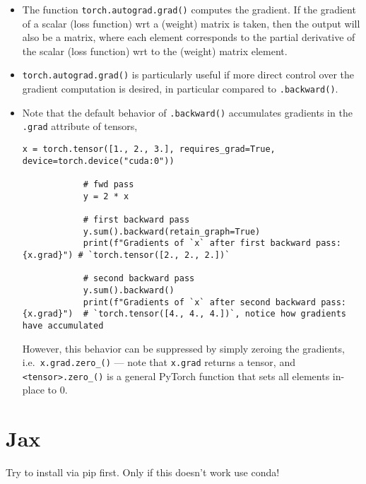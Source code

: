 \documentclass[12pt, a4paper]{scrbook}
\numberwithin{equation}{section}
\theoremstyle{definition}
\theoremstyle{definition}
\begin{document}
	\begin{itemize}
		\item The function \texttt{torch.autograd.grad()} computes the gradient. If the gradient of a scalar (loss function) wrt a (weight) matrix is taken, then the output will also be a matrix, where each element corresponds to the partial derivative of the scalar (loss function) wrt to the (weight) matrix element.
		
		\item \texttt{torch.autograd.grad()} is particularly useful if more direct control over the gradient computation is desired, in particular compared to \texttt{.backward()}.
		
		\item Note that the default behavior of \texttt{.backward()} accumulates gradients in the \texttt{.grad} attribute of tensors,
		
		\begin{lstlisting}[style=mystylepython, label=alg:torch_backward, xleftmargin=\parindent]
			x = torch.tensor([1., 2., 3.], requires_grad=True, device=torch.device("cuda:0"))
			
			# fwd pass
			y = 2 * x
			
			# first backward pass
			y.sum().backward(retain_graph=True)
			print(f"Gradients of `x` after first backward pass: {x.grad}") # `torch.tensor([2., 2., 2.])`
			
			# second backward pass
			y.sum().backward()
			print(f"Gradients of `x` after second backward pass: {x.grad}")  # `torch.tensor([4., 4., 4.])`, notice how gradients have accumulated
		\end{lstlisting}
		
		However, this behavior can be suppressed by simply zeroing the gradients, i.e.~\texttt{x.grad.zero\_()} --- note that \texttt{x.grad} returns a tensor, and \texttt{<tensor>.zero\_()} is a general PyTorch function that sets all elements in-place to $0$.
	\end{itemize} 
	
	\chapter{Jax}
	
	Try to install via pip first. Only if this doesn't work use conda!
	
\end{document}
